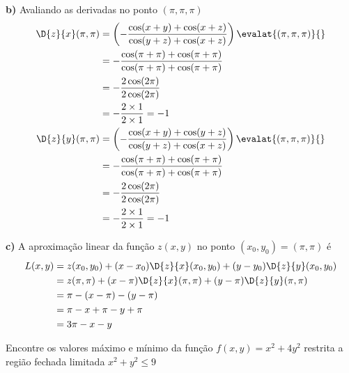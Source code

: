 \documentclass[a4paper,12pt,fleqn]{article}
\begin{document}
\begin{answer}
  \vspace{\baselineskip}
  \textbf{b)\;}
  Avaliando as derivadas no ponto \((\pi, \pi, \pi)\)
  \begin{align*}
    \D{z}{x}(\pi, \pi)
    & = \left(-\frac{\cos(x+y)+\cos(x+z)}{\cos(y+z)+\cos(x+z)}\right)\evalat{(\pi, \pi, \pi)}{} \\
    & = -\frac{\cos(\pi+\pi)+\cos(\pi+\pi)}{\cos(\pi+\pi)+\cos(\pi+\pi)} \\
    & = -\frac{2\cos(2\pi)}{2\cos(2\pi)}  \\
    & = -\frac{2\times 1}{2\times 1}  = -1
    \\
    \D{z}{y}(\pi, \pi)
    & = \left(-\frac{\cos(x+y)+\cos(y+z)}{\cos(y+z)+\cos(x+z)}\right)\evalat{(\pi, \pi, \pi)}{} \\
    & = -\frac{\cos(\pi+\pi)+\cos(\pi+\pi)}{\cos(\pi+\pi)+\cos(\pi+\pi)} \\
    & = -\frac{2\cos(2\pi)}{2\cos(2\pi)}  \\
    & = -\frac{2\times 1}{2\times 1}  = -1
  \end{align*}

  \vspace{\baselineskip}
  \textbf{c)\;}
  A aproximação linear da função $z(x, y)$ no ponto \((x_0, y_0) = (\pi, \pi)\) é
  \begin{align*}
    L(x, y)
    & = z(x_0, y_0) + (x-x_0)\D{z}{x}(x_0, y_0) + (y-y_0)\D{z}{y}(x_0, y_0) \\
    & = z(\pi, \pi) + (x-\pi)\D{z}{x}(\pi, \pi) + (y-\pi)\D{z}{y}(\pi, \pi) \\
    & = \pi -(x-\pi) - (y-\pi) \\
    & = \pi -x +\pi -y +\pi \\
    & = 3\pi -x -y
  \end{align*}
\end{answer}

Encontre os valores máximo e mínimo da função
\(
  f(x, y) = x^2 + 4y^2
\)
restrita a região fechada limitada
\(
  x^2 + y^2 \leq 9
\)
\clearpagequestiononly
\end{document}
